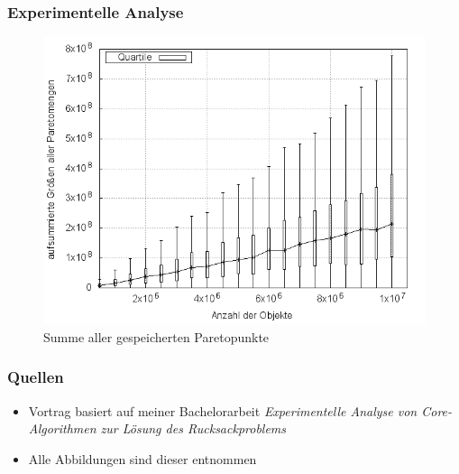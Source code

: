 \documentclass{presentation}
\begin{document}
\begin{frame}
    \frametitle{Experimentelle Analyse}
    \begin{figure}[!htb]
        \centering
        \includegraphics[scale=0.4]{res/core_total_pp.png}
        \caption{Summe aller gespeicherten Paretopunkte}
        \label{fig:core_total_pp}
    \end{figure}
\end{frame}



\begin{frame}
    \frametitle{Quellen}
    \begin{itemize}
        \item Vortrag basiert auf meiner Bachelorarbeit \textit{Experimentelle Analyse von Core-Algorithmen zur Lösung des Rucksackproblems}
        \item Alle Abbildungen sind dieser entnommen
    \end{itemize}
\end{frame}



\begin{frame}
\end{frame}
\end{document}
